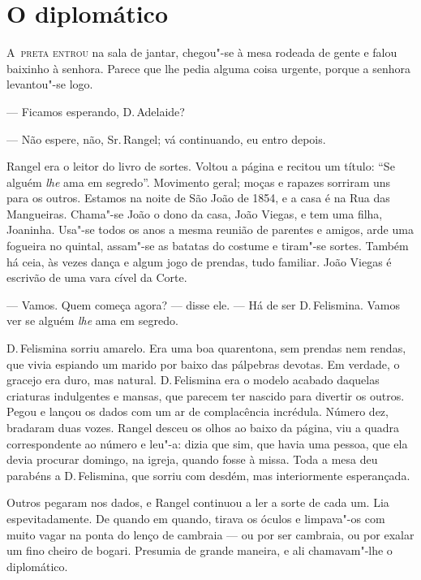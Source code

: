 \chapter{O diplomático}

\begin{linenumbers}

\textsc{A~preta entrou} na sala de jantar, chegou"-se à mesa rodeada de gente e
falou baixinho à senhora. Parece que lhe pedia alguma coisa urgente,
porque a senhora levantou"-se logo.

--- Ficamos esperando, D.\,Adelaide?

--- Não espere, não, Sr.\,Rangel; vá continuando, eu entro depois.

Rangel era o leitor do livro de sortes. Voltou a página e recitou um
título: ``Se alguém \emph{lhe} ama em segredo''. Movimento geral; moças
e rapazes sorriram uns para os outros. Estamos na noite de São João de
1854, e a casa é na Rua das Mangueiras. Chama"-se João o dono da casa,
João Viegas, e tem uma filha, Joaninha. Usa"-se todos os anos a mesma
reunião de parentes e amigos, arde uma fogueira no quintal, assam"-se as
batatas do costume e tiram"-se sortes. Também há ceia, às vezes dança e
algum jogo de prendas, tudo familiar. João Viegas é escrivão de uma vara
cível da Corte.

--- Vamos. Quem começa agora? --- disse ele. --- Há de ser D.\,Felismina.
Vamos ver se alguém \emph{lhe} ama em segredo.

D.\,Felismina sorriu amarelo. Era uma boa quarentona, sem prendas nem
rendas, que vivia espiando um marido por baixo das pálpebras devotas. Em
verdade, o gracejo era duro, mas natural. D.\,Felismina era o modelo
acabado daquelas criaturas indulgentes e mansas, que parecem ter nascido
para divertir os outros. Pegou e lançou os dados com um ar de
complacência incrédula. Número dez, bradaram duas vozes. Rangel desceu
os olhos ao baixo da página, viu a quadra correspondente ao número e
leu"-a: dizia que sim, que havia uma pessoa, que ela devia procurar
domingo, na igreja, quando fosse à missa. Toda a mesa deu parabéns a D.\,Felismina, que sorriu com desdém, mas interiormente esperançada.

Outros pegaram nos dados, e Rangel continuou a ler a sorte de cada um.
Lia espevitadamente. De quando em quando, tirava os óculos e limpava"-os
com muito vagar na ponta do lenço de cambraia --- ou por ser cambraia, ou
por exalar um fino cheiro de bogari. Presumia de grande maneira, e ali
chamavam"-lhe o diplomático.


\end{linenumbers}
